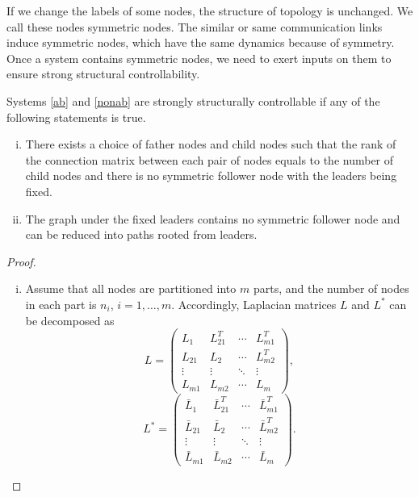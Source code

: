 \documentclass[a4paper,11pt]{article}
\begin{document}
{If we change the labels of some nodes, the structure of topology is unchanged. We call these nodes symmetric nodes. The similar or same communication links induce symmetric nodes, which have the same dynamics because of symmetry.  Once a system contains symmetric nodes, we need to exert inputs on them to ensure strong structural controllability.
\begin{theorem}\label{twocaseofsc}
Systems \eqref{ab} and \eqref{nonab} are strongly structurally controllable if any of the following statements is true.
\begin{enumerate}[i)]
  \item There exists a choice of father nodes and child nodes such that the rank of the connection matrix between each pair of nodes equals to the number of child nodes and there is no symmetric follower node with the leaders being fixed.
  \item The graph under the fixed leaders contains no symmetric follower node and can be reduced into paths rooted from leaders.
\end{enumerate}
\end{theorem}
\begin{proof}
\begin{enumerate}[i)]
  \item Assume that all nodes are partitioned into $m$ parts, and the number of nodes in each part is $n_i$, $i=1,\ldots,m.$ Accordingly, Laplacian matrices $L$ and $L^*$ can be decomposed as
\begin{equation*}
L = \left( {\begin{array}{*{20}{c}}
{{L_1}}&{L_{21}^T}& \cdots &{L_{m1}^T}\\
{{L_{21}}}&{{L_2}}& \cdots &{L_{m2}^T}\\
 \vdots & \vdots & \ddots & \vdots \\
{{L_{m1}}}&{{L_{m2}}}& \cdots &{{L_m}}
\end{array}} \right),\end{equation*}\begin{equation*} L^* = \left( {\begin{array}{*{20}{c}}
{{\bar L_1}}&{\bar L_{21}^T}& \cdots &{\bar L_{m1}^T}\\
{{\bar L_{21}}}&{{\bar L_2}}& \cdots &{\bar L_{m2}^T}\\
 \vdots & \vdots & \ddots & \vdots \\
{{\bar L_{m1}}}&{{\bar L_{m2}}}& \cdots &{{\bar L_m}}
\end{array}} \right).
\end{equation*}

\end{enumerate}
\end{proof}}
\end{document}
